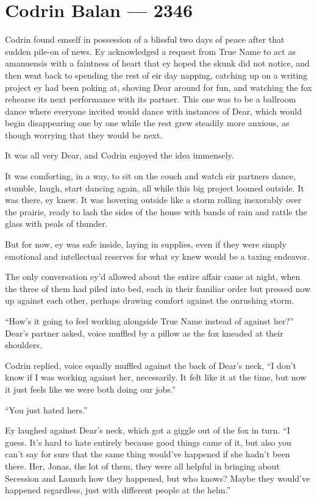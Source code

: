 \hypertarget{codrin-balan-2346}{%
\chapter{Codrin Balan — 2346}\label{codrin-balan-2346}}

Codrin found emself in possession of a blissful two days of peace after that sudden pile-on of news. Ey acknowledged a request from True Name to act as amanuensis with a faintness of heart that ey hoped the skunk did not notice, and then went back to spending the rest of eir day napping, catching up on a writing project ey had been poking at, shoving Dear around for fun, and watching the fox rehearse its next performance with its partner. This one was to be a ballroom dance where everyone invited would dance with instances of Dear, which would begin disappearing one by one while the rest grew steadily more anxious, as though worrying that they would be next.

It was all very Dear, and Codrin enjoyed the idea immensely.

It was comforting, in a way, to sit on the couch and watch eir partners dance, stumble, laugh, start dancing again, all while this big project loomed outside. It was there, ey knew. It was hovering outside like a storm rolling inexorably over the prairie, ready to lash the sides of the house with bands of rain and rattle the glass with peals of thunder.

But for now, ey was safe inside, laying in supplies, even if they were simply emotional and intellectual reserves for what ey knew would be a taxing endeavor.

The only conversation ey'd allowed about the entire affair came at night, when the three of them had piled into bed, each in their familiar order but pressed now up against each other, perhaps drawing comfort against the onrushing storm.

``How's it going to feel working alongside True Name instead of against her?'' Dear's partner asked, voice muffled by a pillow as the fox kneaded at their shoulders.

Codrin replied, voice equally muffled against the back of Dear's neck, ``I don't know if I was working against her, necessarily. It felt like it at the time, but now it just feels like we were both doing our jobs.''

``You just hated hers.''

Ey laughed against Dear's neck, which got a giggle out of the fox in turn. ``I guess. It's hard to hate entirely because good things came of it, but also you can't say for sure that the same thing would've happened if she hadn't been there. Her, Jonas, the lot of them, they were all helpful in bringing about Secession and Launch how they happened, but who knows? Maybe they would've happened regardless, just with different people at the helm.''

